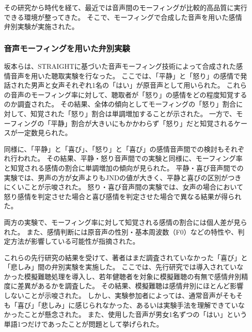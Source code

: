 その研究\cite{laukka2005categorical}から時代を経て、最近では音声間のモーフィングが比較的高品質に実行できる環境が整ってきた\cite{matsui2003STRAIGHT,kawahara2024interactive}。
そこで、モーフィングで合成した音声を用いた感情弁別実験が実施された。

\subsubsection{音声モーフィングを用いた弁別実験}
坂本らは、STRAIGHTに基づいた音声モーフィング技術\cite{matsui2003STRAIGHT}によって合成された感情音声を用いた聴取実験を行なった\cite{sakamoto2020morphEmo}。
ここでは、「平静」と「怒り」の感情で発話された男声と女声それぞれ1名の「はい」が原音声として用いられた。
これらの音声のモーフィング率に対して、聴取者が「怒り」の感情をどの程度知覚するのか調査された。
その結果、全体の傾向としてモーフィングの「怒り」割合に対して、知覚された「怒り」割合は単調増加することが示された。
一方で、モーフィングの「平静」割合が大きいにもかかわらず「怒り」だと知覚されるケースが一定数見られた。

同様に、「平静」と「喜び」、「怒り」と「喜び」の感情音声間での検討もそれぞれ行われた\cite{sakamoto2021morphEmo}。
その結果、平静・怒り音声間での実験と同様に、モーフィング率と知覚される感情の割合に単調増加の傾向が見られた。
平静・喜び音声間での実験では、男声の方が女声よりもJNDの値が大きく、平静と喜びの区別がつきにくいことが示唆された。
怒り・喜び音声間の実験では、女声の場合において怒り感情を判定させた場合と喜び感情を判定させた場合で異なる結果が得られた。

両方の実験で、モーフィング率に対して知覚される感情の割合には個人差が見られた。
また、感情判断には原音声の性別・基本周波数（F0）などの特性や、判定方法が影響している可能性が指摘された。


これらの先行研究\cite{sakamoto2021morphEmo,sakamoto2021morphEmo}の結果を受けて、著者はまだ調査されていなかった「喜び」と「悲しみ」間の弁別実験を実施した\cite{hanatani2023Emo}。
ここでは、先行研究\cite{sakamoto2021morphEmo,sakamoto2021morphEmo}では導入されていなかった模擬難聴処理を導入し、若年健聴者を対象に模擬難聴の有無で感情弁別精度に差異があるかを調査した。
その結果、模擬難聴は感情弁別にほとんど影響しないことが示唆された。
しかし、実験参加者によっては、通常音声がそもそも「喜び」「悲しみ」に感じられなかった、あるいは実験手法を理解できていなかったことが懸念された。
また、使用した音声が男女1名ずつの「はい」という単語1つだけであったことが問題として挙げられた。

